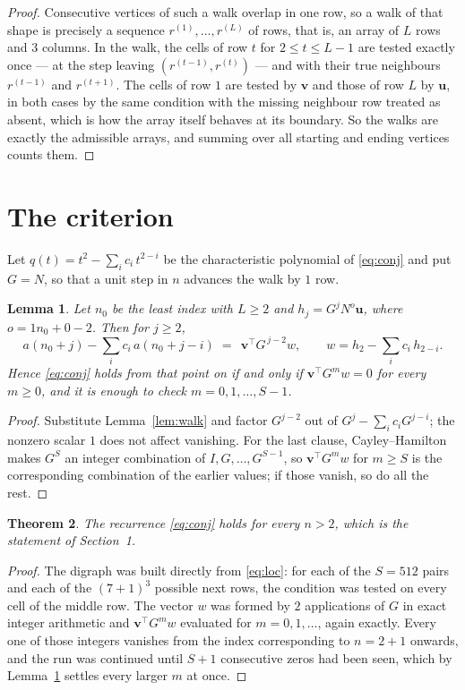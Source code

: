 \documentclass[11pt,a4paper]{article}
\theoremstyle{plain}
\newtheorem{theorem}{Theorem}
\newtheorem{lemma}[theorem]{Lemma}
\theoremstyle{definition}
\begin{document}
\begin{proof}
Consecutive vertices of such a walk overlap in one row, so a walk of that shape is
precisely a sequence $r^{(1)},\dots,r^{(L)}$ of rows, that is, an array of $L$ rows
and $3$ columns. In the walk, the cells of row $t$ for $2\le t\le L-1$ are tested
exactly once --- at the step leaving $(r^{(t-1)},r^{(t)})$ --- and with their true
neighbours $r^{(t-1)}$ and $r^{(t+1)}$. The cells of row $1$ are tested by
$\mathbf{v}$ and those of row $L$ by $\mathbf{u}$, in both cases by the same condition
with the missing neighbour row treated as absent, which is how the array itself behaves at
its boundary. So the walks are exactly the admissible arrays, and summing over all starting
and ending vertices counts them.
\end{proof}

\section{The criterion}

Let $q(t)=t^{2}-\sum_i c_i\,t^{2-i}$ be the characteristic polynomial of
\eqref{eq:conj} and put $G=N$, so that a unit step in $n$ advances the walk by
$1$ row.

\begin{lemma}\label{lem:crit}
Let $n_0$ be the least index with $L\ge2$ and $h_j=G^{j}N^{o}\mathbf{u}$, where
$o=1n_0+0-2$. Then for $j\ge2$,
\[
a(n_0+j)-\sum_i c_i\,a(n_0+j-i)\;=\;\,\mathbf{v}^{\!\top}G^{\,j-2}w,
\qquad w=h_{2}-\sum_i c_i\,h_{2-i} .
\]
Hence \eqref{eq:conj} holds from that point on if and only if
$\mathbf{v}^{\!\top}G^{m}w=0$ for every $m\ge0$, and it is enough to check
$m=0,1,\dots,S-1$.
\end{lemma}

\begin{proof}
Substitute Lemma~\ref{lem:walk} and factor $G^{j-2}$ out of
$G^{j}-\sum_ic_iG^{j-i}$; the nonzero scalar $1$ does not affect
vanishing. For the last clause, Cayley--Hamilton makes $G^{S}$ an integer combination of
$I,G,\dots,G^{S-1}$, so $\mathbf{v}^{\!\top}G^{m}w$ for $m\ge S$ is the corresponding
combination of the earlier values; if those vanish, so do all the rest.
\end{proof}

\begin{theorem}
The recurrence \eqref{eq:conj} holds for every $n>2$, which is the statement of
Section~1.
\end{theorem}

\begin{proof}
The digraph was built directly from \eqref{eq:loc}: for each of the $S=512$ pairs and each
of the $(7+1)^{3}$ possible next rows, the condition was tested on every cell of
the middle row. The vector $w$ was formed by $2$ applications of $G$ in exact integer
arithmetic and $\mathbf{v}^{\!\top}G^{m}w$ evaluated for $m=0,1,\dots$, again exactly.
Every one of those integers vanishes from the index corresponding to $n=2+1$ onwards,
and the run was continued until $S+1$ consecutive zeros had been seen, which by
Lemma~\ref{lem:crit} settles every larger $m$ at once.
\end{proof}
\end{document}
